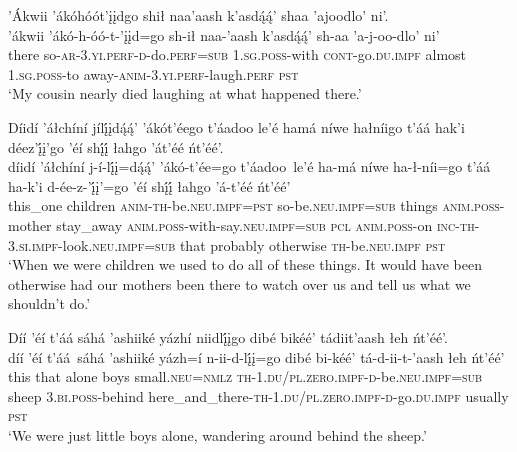\ea\label{ex:text6-9-17}
’Ákwii ’ákóhóót’įįdgo shił naa’aash k’asdą́ą́’ shaa ’ajoodlo’ ni’.\\
\gll ’ákwii	’ákó-h-óó-t-’įįd=go	sh-ił	naa-’aash	k’asdą́ą́’	sh-aa	’a-j-oo-dlo’	ni’\\
     there	so-\textsc{ar}-3.\textsc{yi}.\textsc{perf}-\textsc{d}-do.\textsc{perf}=\textsc{sub}	1.\textsc{sg}.\textsc{poss}-with	\textsc{cont}-go.\textsc{du}.\textsc{impf}	almost	1.\textsc{sg}.\textsc{poss}-to	away-\textsc{anim}-3.\textsc{yi}.\textsc{perf}-laugh.\textsc{perf}	\textsc{pst}\\
\glt `My cousin nearly died laughing at what happened there.'
\z

\ea\label{ex:text6-10-1}
Díidí ’áłchíní jílį́įdą́ą́’ ’ákót’éego t’áadoo le’é hamá níwe hałníigo t’áá hak’i déez’į́į’go ’éí shį́į́ łahgo ’át’éé ńt’éé’.\\
\gll díidí	’áłchíní	j-í-lį́į=dą́ą́’	’ákó-t’ée=go	t’áadoo~{le’é}	ha-má	níwe	ha-ł-níi=go	t’áá	ha-k’i	d-ée-z-’į́į’=go	’éí	shį́į́	łahgo	’á-t’éé	ńt’éé’\\
     this\_one	children	\textsc{anim}-\textsc{th}-be.\textsc{neu}.\textsc{impf}=\textsc{pst}	so-be.\textsc{neu}.\textsc{impf}=\textsc{sub}	things	\textsc{anim}.\textsc{poss}-mother	stay\_away	\textsc{anim}.\textsc{poss}-with-say.\textsc{neu}.\textsc{impf}=\textsc{sub}	\textsc{pcl}	\textsc{anim}.\textsc{poss}-on	\textsc{inc}-\textsc{th}-3.\textsc{si}.\textsc{impf}-look.\textsc{neu}.\textsc{impf}=\textsc{sub}	that	probably	otherwise	\textsc{th}-be.\textsc{neu}.\textsc{impf}	\textsc{pst}\\
\glt `When we were children we used to do all of these things. It would have been otherwise had our mothers been there to watch over us and tell us what we shouldn't do.'
\z

\ea\label{ex:text6-10-2}
Díí ’éí t’áá sáhá ’ashiiké yázhí niidlį́įgo dibé bikéé’ tádiit’aash łeh ńt’éé’.\\
\gll díí	’éí	t’áá~{sáhá}	’ashiiké	yázh=í	n-ii-d-lį́į=go	dibé	bi-kéé’	tá-d-ii-t-’aash	łeh	ńt’éé’\\
     this	that	alone	boys	small.\textsc{neu}=\textsc{nmlz}	\textsc{th}-1.\textsc{du}/\textsc{pl}.\textsc{zero}.\textsc{impf}-\textsc{d}-be.\textsc{neu}.\textsc{impf}=\textsc{sub}	sheep	3.\textsc{bi}.\textsc{poss}-behind	here\_and\_there-\textsc{th}-1.\textsc{du}/\textsc{pl}.\textsc{zero}.\textsc{impf}-\textsc{d}-go.\textsc{du}.\textsc{impf}	usually	\textsc{pst}\\
\glt `We were just little boys alone, wandering around behind the sheep.'
\z

